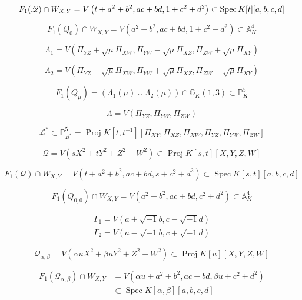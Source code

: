 \[
	F_{1}(\mathscr{Q}) \cap W_{X, Y}=V\left(t+a^{2}+b^{2}, a c+b d, 1+c^{2}+d^{2}\right) \subset \operatorname{Spec} K[t][a, b, c, d]
\]


\[
	F_{1}\left(Q_{0}\right) \cap W_{X, Y}=V\left(a^{2}+b^{2}, a c+b d, 1+c^{2}+d^{2}\right) \subset \mathbb{A}_{K}^{4}
\]

\[
	\Lambda_{1}=V\left(\Pi_{Y Z}+\sqrt{\mu} \Pi_{X W}, \Pi_{Y W}-\sqrt{\mu} \Pi_{X Z}, \Pi_{Z W}+\sqrt{\mu} \Pi_{X Y}\right)
\]

\[
	\Lambda_{2}=V\left(\Pi_{Y Z}-\sqrt{\mu} \Pi_{X W}, \Pi_{Y W}+\sqrt{\mu} \Pi_{X Z}, \Pi_{Z W}-\sqrt{\mu} \Pi_{X Y}\right)
\]

\[
	F_{1}\left(Q_{\mu}\right)=\left(\Lambda_{1}(\mu) \cup \Lambda_{2}(\mu)\right) \cap \mathbb{G}_{K}(1,3) \subset \mathbb{P}_{K}^{5}
\]


\[
	\Lambda=V\left(\Pi_{Y Z}, \Pi_{Y W}, \Pi_{Z W}\right)
\]

\[
	\mathscr{L}^{*} \subset \mathbb{P}_{B^{*}}^{5}=\operatorname{Proj} K\left[t, t^{-1}\right]\left[\Pi_{X Y}, \Pi_{X Z}, \Pi_{X W}, \Pi_{Y Z}, \Pi_{Y W}, \Pi_{Z W}\right]
\]


\[
	\mathscr{Q}=V\left(s X^{2}+t Y^{2}+Z^{2}+W^{2}\right) \subset \operatorname{Proj} K[s, t][X, Y, Z, W]
\]

\[
	F_{1}(\mathscr{Q}) \cap W_{X, Y}=V\left(t+a^{2}+b^{2}, a c+b d, s+c^{2}+d^{2}\right) \subset \operatorname{Spec} K[s, t][a, b, c, d]
\]

\[
	F_{1}\left(Q_{0,0}\right) \cap W_{X, Y}=V\left(a^{2}+b^{2}, a c+b d, c^{2}+d^{2}\right) \subset \mathbb{A}_{K}^{4}
\]

\[
\begin{array}{l}{\Gamma_{1}=V(a+\sqrt{-1} b, c-\sqrt{-1} d)} \\ {\Gamma_{2}=V(a-\sqrt{-1} b, c+\sqrt{-1} d)}\end{array}
\]

\[
	\mathscr{Q}_{\alpha, \beta}=V\left(\alpha u X^{2}+\beta u Y^{2}+Z^{2}+W^{2}\right) \subset \operatorname{Proj} K[u][X, Y, Z, W]
\]

\[
\begin{aligned} F_{1}\left(\mathscr{Q}_{\alpha, \beta}\right) \cap W_{X, Y} &=V\left(\alpha u+a^{2}+b^{2}, a c+b d, \beta u+c^{2}+d^{2}\right) \\ & \subset \operatorname{Spec} K[\alpha, \beta][a, b, c, d] \end{aligned}
\]

